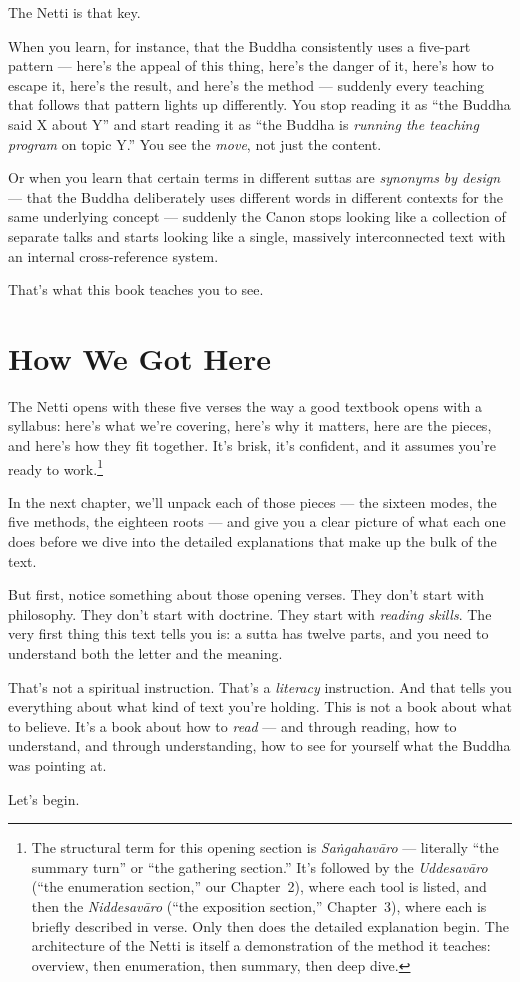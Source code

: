 The Netti is that key.

When you learn, for instance, that the Buddha consistently uses a five-part pattern --- here's the appeal of this thing, here's the danger of it, here's how to escape it, here's the result, and here's the method --- suddenly every teaching that follows that pattern lights up differently. You stop reading it as ``the Buddha said X about Y'' and start reading it as ``the Buddha is \textit{running the teaching program} on topic Y.'' You see the \textit{move}, not just the content.

Or when you learn that certain terms in different suttas are \textit{synonyms by design} --- that the Buddha deliberately uses different words in different contexts for the same underlying concept --- suddenly the Canon stops looking like a collection of separate talks and starts looking like a single, massively interconnected text with an internal cross-reference system.

That's what this book teaches you to see.

\ornament

\section*{How We Got Here}

The Netti opens with these five verses the way a good textbook opens with a syllabus: here's what we're covering, here's why it matters, here are the pieces, and here's how they fit together. It's brisk, it's confident, and it assumes you're ready to work.\footnote{The structural term for this opening section is \textit{Saṅgahavāro} --- literally ``the summary turn'' or ``the gathering section.'' It's followed by the \textit{Uddesavāro} (``the enumeration section,'' our Chapter~2), where each tool is listed, and then the \textit{Niddesavāro} (``the exposition section,'' Chapter~3), where each is briefly described in verse. Only then does the detailed explanation begin. The architecture of the Netti is itself a demonstration of the method it teaches: overview, then enumeration, then summary, then deep dive.}

In the next chapter, we'll unpack each of those pieces --- the sixteen modes, the five methods, the eighteen roots --- and give you a clear picture of what each one does before we dive into the detailed explanations that make up the bulk of the text.

But first, notice something about those opening verses. They don't start with philosophy. They don't start with doctrine. They start with \textit{reading skills}. The very first thing this text tells you is: a sutta has twelve parts, and you need to understand both the letter and the meaning.

That's not a spiritual instruction. That's a \textit{literacy} instruction. And that tells you everything about what kind of text you're holding. This is not a book about what to believe. It's a book about how to \textit{read} --- and through reading, how to understand, and through understanding, how to see for yourself what the Buddha was pointing at.

Let's begin.
